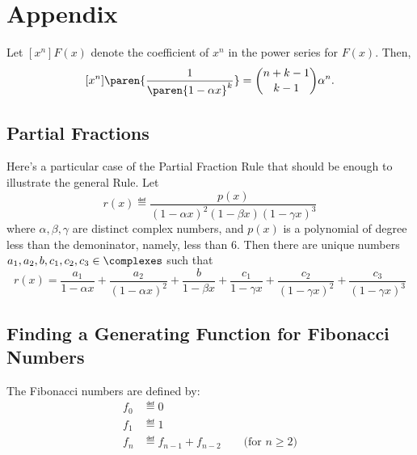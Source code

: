 \documentclass[handout]{mcs}
\begin{document}




\section*{Appendix}

Let $[x^n]F(x)$ denote the coefficient of $x^n$ in the power series
for $F(x)$.  Then,
\begin{equation}\label{1axk}
[x^n]\paren{\frac{1}{\paren{1-\alpha x}^k}} = \binom{n+k-1}{k-1}\alpha^n.
\end{equation}

\subsection*{Partial Fractions}

Here's a particular case of the Partial Fraction Rule that should be
enough to illustrate the general Rule.  Let
\[
r(x) \eqdef \frac{p(x)}{(1-\alpha x)^2 (1-\beta x) (1-\gamma x)^3}
\]
where $\alpha, \beta, \gamma$ are distinct complex numbers, and $p(x)$ is
a polynomial of degree less than the demoninator, namely, less than 6.
Then there are unique numbers $a_1,a_2,b,c_1,c_2,c_3 \in \complexes$ such
that
\[
r(x)
= \frac{a_1}{1-\alpha x} + \frac{a_2}{(1-\alpha x)^2}
+ \frac{b}{1-\beta x}
+ \frac{c_1}{1-\gamma x} + \frac{c_2}{(1-\gamma x)^2} + \frac{c_3}{(1-\gamma x)^3}
\]

\iffalse

Partial fractions together with~\eqref{1axk} imply that there is a closed
form expression for $[x^n]\paren{R(x)/S(x)}$ for arbitrary polynomials
$R(x),S(x)$.
\fi

\subsection*{Finding a Generating Function for Fibonacci Numbers}
The Fibonacci numbers are defined by:
\begin{align*}
f_0 & \eqdef 0 \\
f_1 & \eqdef 1 \\
f_n & \eqdef f_{n-1} + f_{n-2} \qquad \text{(for $n \geq 2$)}
\end{align*}
\end{document}
